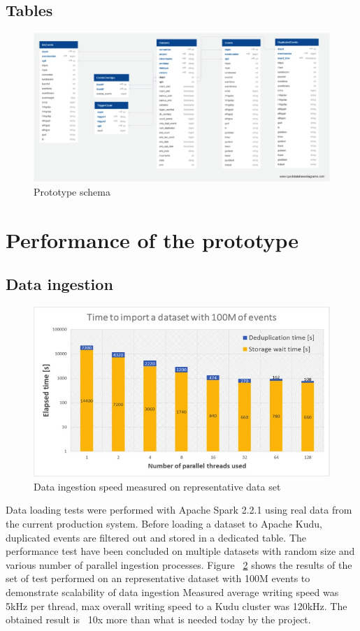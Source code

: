 \documentclass{webofc}
\begin{document}
\subsection{Tables}
\label{sec-5-tables}
\begin{figure}
\centering
\includegraphics[width=\linewidth,clip]{schema.jpg}
\caption{Prototype schema}
\label{fig:schema}
\end{figure}
\section{Performance of the prototype}
\label{sec-6}


\subsection{Data ingestion}
\label{sec-6-di}
\begin{figure}
\centering
\includegraphics[width=\linewidth,clip]{ingestion.jpg}
\caption{Data ingestion speed measured on representative data set}
\label{fig:ingestion}
\end{figure}
Data loading tests were performed with Apache Spark 2.2.1 using real data from the current production system.
Before loading a dataset to Apache Kudu, duplicated events are filtered out and stored in a dedicated table. The performance test have been concluded on multiple datasets with random size and various number of parallel ingestion processes. 
Figure ~\ref{fig:ingestion} shows the results of the set of test performed on an representative dataset with 100M events to demonstrate scalability of data ingestion 
Measured average writing speed was 5kHz per thread, max overall writing speed to a Kudu cluster was 120kHz. The obtained result is ~10x more than what is needed today by the project.
\end{document}
